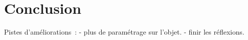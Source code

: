 \section{Conclusion}

Pistes d'améliorations~:
- plus de paramétrage sur l'objet.
- finir les réflexions.

